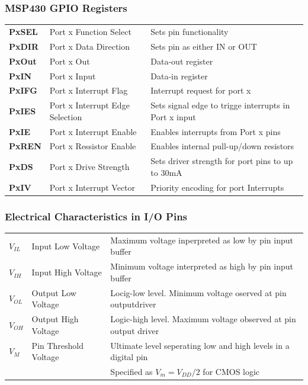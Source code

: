 \subsubsection{MSP430 GPIO Registers}
\begin{tabular}{>{\bfseries}lll}
	PxSEL   &Port x Function Select             & Sets pin functionality  \\ 
	PxDIR   &Port x Data Direction              & Sets pin as either IN or OUT \\ 
	PxOut   &Port x Out                         & Data-out register \\ 
	PxIN    &Port x Input                       & Data-in register  \\ 
	PxIFG   &Port x Interrupt Flag              & Interrupt request for port x \\ 
	PxIES   &Port x Interrupt Edge Selection    & Sets signal edge to trigge interrupts in Port x input  \\ 
	PxIE    &Port x Interrupt Enable            & Enables interrupts from Port x pins \\ 
	PxREN   &Port x Ressistor Enable            & Enables internal pull-up/down resistors \\ 
	PxDS    &Port x Drive Strength              & Sets driver strength for port pins to up to 30mA  \\ 
	PxIV    &Port x Interrupt Vector            & Priority encoding for port Interrupts \\ 
\end{tabular} 

\subsubsection{Electrical Characteristics in I/O Pins}
\begin{tabular}{lll}
	$ V_{IL} $& Input Low Voltage&Maximum voltage inperpreted as low by pin input buffer\\
	$ V_{IH} $& Input High Voltage& Minimum voltage interpreted as high by pin input buffer\\
	$ V_{OL} $& Output Low Voltage& Locig-low level. Minimum voltage oserved at pin outputdriver\\
	$ V_{OH} $& Output High Voltage& Logic-high level. Maximum voltage observed at pin output driver\\
	$ V_M $   & Pin Threshold Voltage& Ultimate level seperating low and high levels in a digital pin\\
	&                      & Specified as $ V_m=V_{DD}/2 $ for CMOS logic\\
\end{tabular} 
\clearpage

